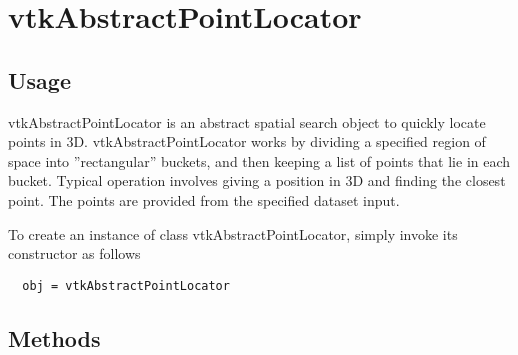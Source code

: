\section{vtkAbstractPointLocator}

\subsection{Usage}

 vtkAbstractPointLocator is an abstract spatial search object to quickly locate points
 in 3D. vtkAbstractPointLocator works by dividing a specified region of space into 
 ''rectangular'' buckets, and then keeping a list of points that 
 lie in each bucket. Typical operation involves giving a position in 3D 
 and finding the closest point.  The points are provided from the specified 
 dataset input.

To create an instance of class vtkAbstractPointLocator, simply
invoke its constructor as follows
\begin{verbatim}
  obj = vtkAbstractPointLocator
\end{verbatim}
\subsection{Methods}

